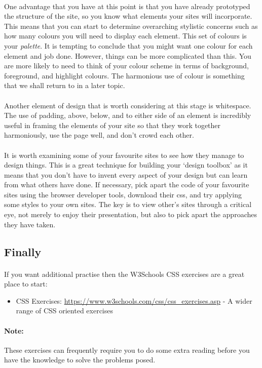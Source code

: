 \documentclass[10pt, a4paper, twosize]{article}
\begin{document}
\paragraph{} One advantage that you have at this point is that you have already prototyped the structure of the site, so you know what elements your sites will incorporate. This means that you can start to determine overarching stylistic concerns such as how many colours you will need to display each element. This set of colours is your \emph{palette}. It is tempting to conclude that you might want one colour for each element and job done. However, things can be more complicated than this. You are more likely to need to think of your colour scheme in terms of background, foreground, and highlight colours. The harmonious use of colour is something that we shall return to in a later topic. 

\paragraph{} Another element of design that is worth considering at this stage is whitespace. The use of padding, above, below, and to either side of an element is incredibly useful in framing the elements of your site so that they work together harmoniously, use the page well, and don't crowd each other.

\paragraph{} It is worth examining some of your favourite sites to see how they manage to design things. This is a great technique for building your `design toolbox' as it means that you don't have to invent every aspect of your design but can learn from what others have done. If necessary, pick apart the code of your favourite sites using the browser developer tools, download their css, and try applying some styles to your own sites. The key is to view other's sites through a critical eye, not merely to enjoy their presentation, but also to pick apart the approaches they have taken. 

\subsection{Finally}
\paragraph{} If you want additional practise then the W3Schools CSS exercises are a great place to start:
\begin{itemize}
\item CSS Exercises: \url{https://www.w3schools.com/css/css_exercises.asp} - A wider range of CSS oriented exercises
\end{itemize}

\paragraph{Note:} These exercises can frequently require you to do some extra reading before you have the knowledge to solve the problems posed.
\end{document}
